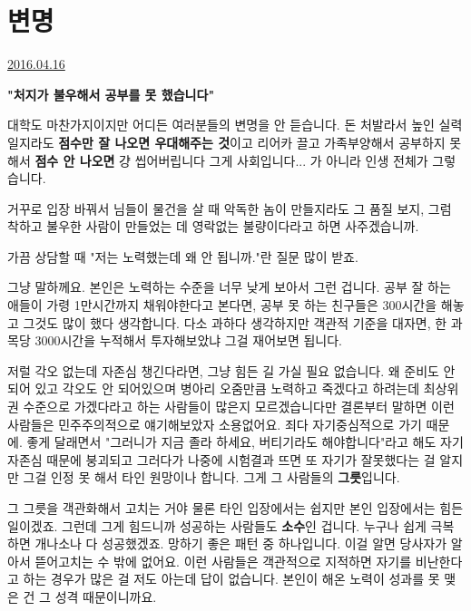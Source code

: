 \section{변명}
\href{https://www.kockoc.com/Apoc/732675}{2016.04.16}

\vspace{5mm}

\textbf{"처지가 불우해서 공부를 못 했습니다"}
\vspace{5mm}

대학도 마찬가지이지만 어디든 여러분들의 변명을 안 듣습니다.
돈 처발라서 높인 실력일지라도 \textbf{점수만 잘 나오면 우대해주는 것}이고
리어카 끌고 가족부양해서 공부하지 못 해서 \textbf{점수 안 나오면} 걍 씹어버립니다
그게 사회입니다... 가 아니라 인생 전체가 그렇습니다.
\vspace{5mm}

거꾸로 입장 바꿔서 님들이 물건을 살 때 악독한 놈이 만들지라도 그 품질 보지,
그럼 착하고 불우한 사람이 만들었는 데 영락없는 불량이다라고 하면 사주겠습니까.
\vspace{5mm}

가끔 상담할 때 "저는 노력했는데 왜 안 됩니까."란 질문 많이 받죠.
\vspace{5mm}

그냥 말하께요. 본인은 노력하는 수준을 너무 낮게 보아서 그런 겁니다.
공부 잘 하는 애들이 가령 1만시간까지 채워야한다고 본다면, 공부 못 하는 친구들은 300시간을 해놓고 그것도 많이 했다 생각합니다.
다소 과하다 생각하지만 객관적 기준을 대자면, 한 과목당 3000시간을 누적해서 투자해보았냐 그걸 재어보면 됩니다.
\vspace{5mm}

저럴 각오 없는데 자존심 챙긴다라면, 그냥 힘든 길 가실 필요 없습니다.
왜 준비도 안 되어 있고 각오도 안 되어있으며 병아리 오줌만큼 노력하고 죽겠다고 하려는데
최상위권 수준으로 가겠다라고 하는 사람들이 많은지 모르겠습니다만
결론부터 말하면 이런 사람들은 민주주의적으로 얘기해보았자 소용없어요. 죄다 자기중심적으로 가기 때문에.
좋게 달래면서 "그러니가 지금 졸라 하세요, 버티기라도 해야합니다"라고 해도 자기 자존심 때문에 붕괴되고 그러다가
나중에 시험결과 뜨면 또 자기가 잘못했다는 걸 알지만 그걸 인정 못 해서 타인 원망이나 합니다. 그게 그 사람들의 \textbf{그릇}입니다.
\vspace{5mm}

그 그릇을 객관화해서 고치는 거야 물론 타인 입장에서는 쉽지만 본인 입장에서는 힘든 일이겠죠.
그런데 그게 힘드니까 성공하는 사람들도 \textbf{소수}인 겁니다. 누구나 쉽게 극복하면 개나소나 다 성공했겠죠.
망하기 좋은 패턴 중 하나입니다. 이걸 알면 당사자가 알아서 뜯어고치는 수 밖에 없어요.
이런 사람들은 객관적으로 지적하면 자기를 비난한다고 하는 경우가 많은 걸 저도 아는데 답이 없습니다.
본인이 해온 노력이 성과를 못 맺은 건 그 성격 때문이니까요.
\vspace{5mm}

